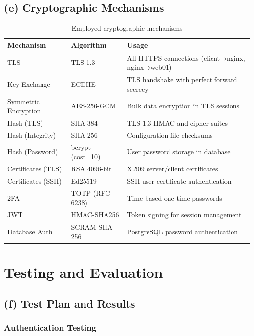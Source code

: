 \subsection{(e) Cryptographic Mechanisms}

\begin{table}[h]
\centering
\begin{tabular}{|l|l|p{6.5cm}|}
\hline
\textbf{Mechanism} & \textbf{Algorithm} & \textbf{Usage} \\
\hline
TLS & TLS 1.3 & All HTTPS connections (client→nginx, nginx→web01) \\
\hline
Key Exchange & ECDHE & TLS handshake with perfect forward secrecy \\
\hline
Symmetric Encryption & AES-256-GCM & Bulk data encryption in TLS sessions \\
\hline
Hash (TLS) & SHA-384 & TLS 1.3 HMAC and cipher suites \\
\hline
Hash (Integrity) & SHA-256 & Configuration file checksums \\
\hline
Hash (Password) & bcrypt (cost=10) & User password storage in database \\
\hline
Certificates (TLS) & RSA 4096-bit & X.509 server/client certificates \\
\hline
Certificates (SSH) & Ed25519 & SSH user certificate authentication \\
\hline
2FA & TOTP (RFC 6238) & Time-based one-time passwords \\
\hline
JWT & HMAC-SHA256 & Token signing for session management \\
\hline
Database Auth & SCRAM-SHA-256 & PostgreSQL password authentication \\
\hline
\end{tabular}
\caption{Employed cryptographic mechanisms}
\end{table}

\section{Testing and Evaluation}

\subsection{(f) Test Plan and Results}

\subsubsection{Authentication Testing}

